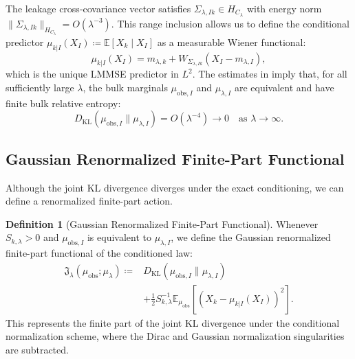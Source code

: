 \documentclass[11pt]{amsart}
\theoremstyle{plain}
\theoremstyle{definition}
\newtheorem{definition}[theorem]{Definition}
\theoremstyle{remark}
\newcommand{\KL}{D_{\operatorname{KL}}}
\newcommand{\E}{\mathbb{E}}
\begin{document}
The leakage cross-covariance vector satisfies $\Sigma_{\lambda,Ik} \in H_{C_\lambda}$ with energy norm $\|\Sigma_{\lambda,Ik}\|_{H_{C_\lambda}} = O(\lambda^{-3})$. This range inclusion allows us to define the conditional predictor $\mu_{k|I}(X_I) \coloneqq \E[X_k \mid X_I]$ as a measurable Wiener functional:
\begin{equation}
  \mu_{k|I}(X_I) = m_{\lambda,k} + W_{\Sigma_{\lambda,Ik}}(X_I - m_{\lambda,I}),
\end{equation}
which is the unique LMMSE predictor in $L^2$. The estimates in  imply that, for all sufficiently large $\lambda$, the bulk marginals $\mu_{\text{obs},I}$ and $\mu_{\lambda,I}$ are equivalent and have finite bulk relative entropy:
\begin{equation}
  \KL(\mu_{\text{obs},I} \parallel \mu_{\lambda,I}) = O(\lambda^{-4}) \to 0 \quad \text{as } \lambda \to \infty.
\end{equation}

\subsection{Gaussian Renormalized Finite-Part Functional}
\label{sec:gaussian:functional}

Although the joint KL divergence diverges under the exact conditioning, we can define a renormalized finite-part action.

\begin{definition}[Gaussian Renormalized Finite-Part Functional]
  \label{def:unified_action}
  Whenever $S_{k,\lambda}>0$ and $\mu_{\text{obs},I}$ is equivalent to $\mu_{\lambda,I}$, we define the Gaussian renormalized finite-part functional of the conditioned law:
  \begin{equation}
    \label{eq:unified_action}
    \begin{aligned}
      \mathfrak{J}_\lambda(\mu_{\mathrm{obs}}; \mu_\lambda) \coloneqq &\KL(\mu_{\mathrm{obs},I} \parallel \mu_{\lambda,I}) \\
      &+ \frac{1}{2} S_{k,\lambda}^{-1} \E_{\mu_{\mathrm{obs}}}\left[ \left( X_k - \mu_{k|I}(X_I) \right)^2 \right].
    \end{aligned}
  \end{equation}
  This represents the finite part of the joint KL divergence under the conditional normalization scheme, where the Dirac and Gaussian normalization singularities are subtracted.
\end{definition}
\end{document}
